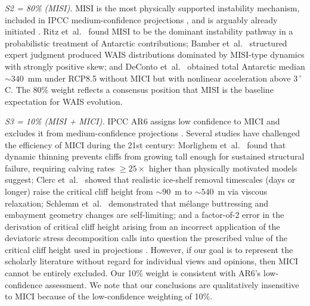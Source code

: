 \documentclass[12pt]{article}
\newcommand{\subsubsubsection}[1]{\paragraph{#1}\mbox{}\par}
\begin{document}
\textit{S2 = 80\% (MISI).} MISI is the most physically supported instability mechanism, included in IPCC medium-confidence projections \citep{Fox-Kemper2021}, and is arguably already initiated \citep{Joughin2014, Rignot2026}. Ritz et~al.~\citep{Ritz2015} found MISI to be the dominant instability pathway in a probabilistic treatment of Antarctic contributions; Bamber et~al.~\citep{Bamber2019} structured expert judgment produced WAIS distributions dominated by MISI-type dynamics with strongly positive skew; and DeConto et~al.~\citep{DeConto2021} obtained total Antarctic median ${\sim}340$~mm under RCP8.5 without MICI but with nonlinear acceleration above 3$\,^\circ$C. The 80\% weight reflects a consensus position that MISI is the baseline expectation for WAIS evolution.

\textit{S3 = 10\% (MISI + MICI).} IPCC AR6 assigns low confidence to MICI and excludes it from medium-confidence projections \citep{Fox-Kemper2021}. Several studies have challenged the efficiency of MICI during the 21st century: Morlighem et~al.~\citep{Morlighem2024} found that dynamic thinning prevents cliffs from growing tall enough for sustained structural failure, requiring calving rates $\geq 25\times$ higher than physically motivated models suggest; Clerc et~al.~\citep{Clerc2019} showed that realistic ice-shelf removal timescales (days or longer) raise the critical cliff height from ${\sim}90$~m to ${\sim}540$~m via viscous relaxation; Schlemm et~al.~\citep{Schlemm2022} demonstrated that m\'{e}lange buttressing and embayment geometry changes are self-limiting; and a factor-of-2 error in the derivation of critical cliff height arising from an incorrect application of the deviatoric stress decomposition \citep[cf. Eq. 1 of][]{Bassis2012} calls into question the prescribed value of the critical cliff height used in projections \citep{DeContoP2016}. However, if our goal is to represent the scholarly literature without regard for individual views and opinions, then MICI cannot be entirely excluded. Our 10\% weight is consistent with AR6's low-confidence assessment. We note that our conclusions are qualitatively insensitive to MICI because of the low-confidence weighting of 10\%.


\end{document}
